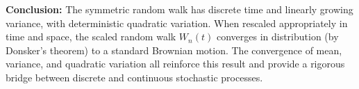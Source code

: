 \vspace{1em}
\textbf{Conclusion:}  
The symmetric random walk has discrete time and linearly growing variance, with deterministic quadratic variation. When rescaled appropriately in time and space, the scaled random walk \( W_n(t) \) converges in distribution (by Donsker's theorem) to a standard Brownian motion. The convergence of mean, variance, and quadratic variation all reinforce this result and provide a rigorous bridge between discrete and continuous stochastic processes.